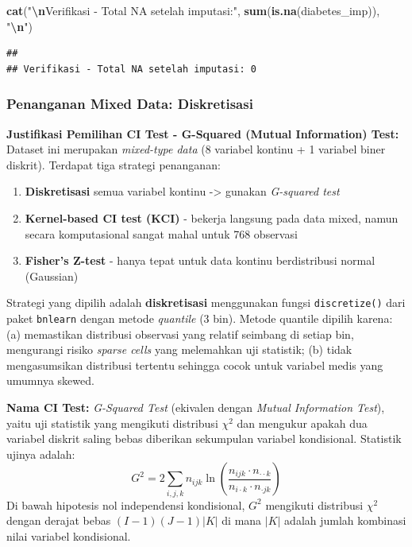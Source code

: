 \documentclass[
  11pt,
]{article}
\newenvironment{Shaded}{\begin{snugshade}}{\end{snugshade}}
\newcommand{\FunctionTok}[1]{\textcolor[rgb]{0.13,0.29,0.53}{\textbf{#1}}}
\newcommand{\NormalTok}[1]{#1}
\newcommand{\SpecialCharTok}[1]{\textcolor[rgb]{0.81,0.36,0.00}{\textbf{#1}}}
\newcommand{\StringTok}[1]{\textcolor[rgb]{0.31,0.60,0.02}{#1}}
\providecommand{\tightlist}{%
  \setlength{\itemsep}{0pt}\setlength{\parskip}{0pt}}
\begin{document}
\begin{Shaded}
\begin{Highlighting}[]
\FunctionTok{cat}\NormalTok{(}\StringTok{"}\SpecialCharTok{\textbackslash{}n}\StringTok{Verifikasi {-} Total NA setelah imputasi:"}\NormalTok{,}
    \FunctionTok{sum}\NormalTok{(}\FunctionTok{is.na}\NormalTok{(diabetes\_imp)), }\StringTok{"}\SpecialCharTok{\textbackslash{}n}\StringTok{"}\NormalTok{)}
\end{Highlighting}
\end{Shaded}

\begin{verbatim}
## 
## Verifikasi - Total NA setelah imputasi: 0
\end{verbatim}

\subsubsection{Penanganan Mixed Data:
Diskretisasi}\label{penanganan-mixed-data-diskretisasi}

\textbf{Justifikasi Pemilihan CI Test - G-Squared (Mutual Information)
Test:} Dataset ini merupakan \emph{mixed-type data} (8 variabel kontinu
+ 1 variabel biner diskrit). Terdapat tiga strategi penanganan:

\begin{enumerate}
\def\labelenumi{\arabic{enumi}.}
\tightlist
\item
  \textbf{Diskretisasi} semua variabel kontinu -\textgreater{} gunakan
  \emph{G-squared test}
\item
  \textbf{Kernel-based CI test (KCI)} - bekerja langsung pada data
  mixed, namun secara komputasional sangat mahal untuk 768 observasi
\item
  \textbf{Fisher's Z-test} - hanya tepat untuk data kontinu
  berdistribusi normal (Gaussian)
\end{enumerate}

Strategi yang dipilih adalah \textbf{diskretisasi} menggunakan fungsi
\texttt{discretize()} dari paket \texttt{bnlearn} dengan metode
\emph{quantile} (3 bin). Metode quantile dipilih karena: (a) memastikan
distribusi observasi yang relatif seimbang di setiap bin, mengurangi
risiko \emph{sparse cells} yang melemahkan uji statistik; (b) tidak
mengasumsikan distribusi tertentu sehingga cocok untuk variabel medis
yang umumnya skewed.

\textbf{Nama CI Test:} \emph{G-Squared Test} (ekivalen dengan
\emph{Mutual Information Test}), yaitu uji statistik yang mengikuti
distribusi \(\chi^2\) dan mengukur apakah dua variabel diskrit saling
bebas diberikan sekumpulan variabel kondisional. Statistik ujinya
adalah:
\[G^2 = 2 \sum_{i,j,k} n_{ijk} \ln\!\left(\frac{n_{ijk} \cdot n_{\cdot\cdot k}}{n_{i\cdot k} \cdot n_{\cdot jk}}\right)\]
Di bawah hipotesis nol independensi kondisional, \(G^2\) mengikuti
distribusi \(\chi^2\) dengan derajat bebas \((I-1)(J-1)|K|\) di mana
\(|K|\) adalah jumlah kombinasi nilai variabel kondisional.
\end{document}
